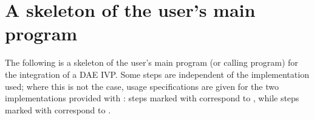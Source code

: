 \section{A skeleton of the user's main program}\label{ss:skeleton_sim}

The following is a skeleton of the user's main program (or calling
program) for the integration of a DAE IVP. Some steps are independent of the
{\nvector} implementation used; where this is not the case, usage specifications
are given for the two implementations provided with {\ida}: steps marked with {\p}
correspond to {\nvecp}, while steps marked with {\s} correspond to {\nvecs}.
